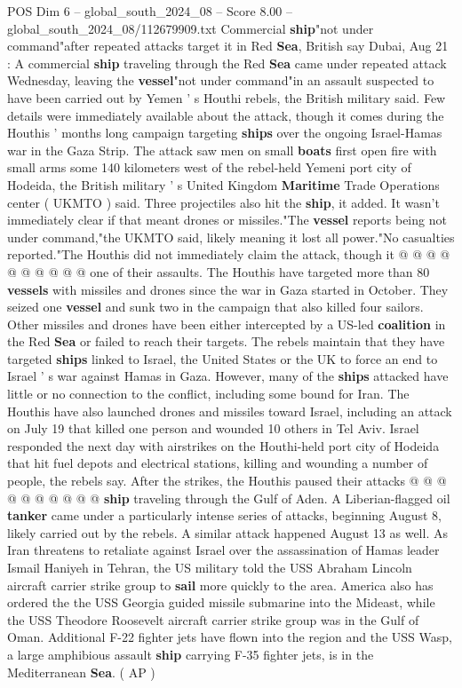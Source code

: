 \begin{textsample}{POS Dim 6 – global\_south\_2024\_08 – Score 8.00 – global\_south\_2024\_08/112679909.txt}  \label{ex:f6_pos_323}
Commercial \textbf{ship}"not under command"after repeated attacks target it in Red \textbf{Sea}, British say Dubai, Aug 21 : A commercial \textbf{ship} traveling through the Red \textbf{Sea} came under repeated attack Wednesday, leaving the \textbf{vessel}"not under command"in an assault suspected to have been carried out by Yemen ' s Houthi rebels, the British military said.
Few details were immediately available about the attack, though it comes during the Houthis ' months long campaign targeting \textbf{ships} over the ongoing Israel-Hamas war in the Gaza Strip.
The attack saw men on small \textbf{boats} first open fire with small arms some 140 kilometers west of the rebel-held Yemeni port city of Hodeida, the British military ' s United Kingdom \textbf{Maritime} Trade Operations center ( UKMTO ) said.
Three projectiles also hit the \textbf{ship}, it added.
It wasn't immediately clear if that meant drones or missiles."The \textbf{vessel} reports being not under command,"the UKMTO said, likely meaning it lost all power."No casualties reported."The Houthis did not immediately claim the attack, though it @ @ @ @ @ @ @ @ @ @ one of their assaults.
The Houthis have targeted more than 80 \textbf{vessels} with missiles and drones since the war in Gaza started in October.
They seized one \textbf{vessel} and sunk two in the campaign that also killed four sailors.
Other missiles and drones have been either intercepted by a US-led \textbf{coalition} in the Red \textbf{Sea} or failed to reach their targets.
The rebels maintain that they have targeted \textbf{ships} linked to Israel, the United States or the UK to force an end to Israel ' s war against Hamas in Gaza.
However, many of the \textbf{ships} attacked have little or no connection to the conflict, including some bound for Iran.
The Houthis have also launched drones and missiles toward Israel, including an attack on July 19 that killed one person and wounded 10 others in Tel Aviv.
Israel responded the next day with airstrikes on the Houthi-held port city of Hodeida that hit fuel depots and electrical stations, killing and wounding a number of people, the rebels say.
After the strikes, the Houthis paused their attacks @ @ @ @ @ @ @ @ @ @ \textbf{ship} traveling through the Gulf of Aden.
A Liberian-flagged oil \textbf{tanker} came under a particularly intense series of attacks, beginning August 8, likely carried out by the rebels.
A similar attack happened August 13 as well.
As Iran threatens to retaliate against Israel over the assassination of Hamas leader Ismail Haniyeh in Tehran, the US military told the USS Abraham Lincoln aircraft carrier strike group to \textbf{sail} more quickly to the area.
America also has ordered the the USS Georgia guided missile submarine into the Mideast, while the USS Theodore Roosevelt aircraft carrier strike group was in the Gulf of Oman.
Additional F-22 fighter jets have flown into the region and the USS Wasp, a large amphibious assault \textbf{ship} carrying F-35 fighter jets, is in the Mediterranean \textbf{Sea}. ( AP )

\end{textsample}
